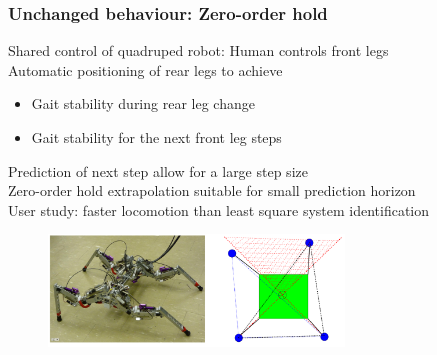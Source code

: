 \documentclass[student]{ITRslides}
\begin{document}
\begin{frame}

	\frametitle{Unchanged behaviour: Zero-order hold}
	Shared control of quadruped robot: Human controls front legs \\
	Automatic positioning of rear legs to achieve
	\begin{itemize}
	\item Gait stability during rear leg change
	\item Gait stability for the next front leg steps
	\end{itemize}
	Prediction of next step allow for a large step size\\
	
\noindent{\color{tum_blue}\rule[0.5ex]{\linewidth}{1.5pt}}\vspace{-4pt}
	Zero-order hold extrapolation suitable for small prediction horizon\\
	User study: faster locomotion than least square system identification
	\begin{figure}
			\centering
			\includegraphics[width=0.7\textwidth]{4MPC.png}			
	\end{figure}
%
\end{frame}


%
\end{document}
